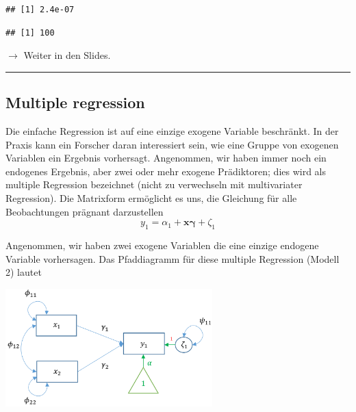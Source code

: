 \documentclass[
]{article}
\newenvironment{Shaded}{\begin{snugshade}}{\end{snugshade}}
\newcommand{\FunctionTok}[1]{\textcolor[rgb]{0.00,0.00,0.00}{#1}}
\newcommand{\NormalTok}[1]{#1}
\newcommand{\SpecialCharTok}[1]{\textcolor[rgb]{0.00,0.00,0.00}{#1}}
\begin{document}
\begin{Shaded}
\end{Shaded}

\begin{verbatim}
## [1] 2.4e-07
\end{verbatim}

\begin{Shaded}
\end{Shaded}

\begin{verbatim}
## [1] 100
\end{verbatim}

\(\rightarrow\) Weiter in den Slides.

\begin{center}\rule{0.5\linewidth}{0.5pt}\end{center}

\hypertarget{multiple-regression}{%
\subsection{Multiple regression}\label{multiple-regression}}

Die einfache Regression ist auf eine einzige exogene Variable
beschränkt. In der Praxis kann ein Forscher daran interessiert sein, wie
eine Gruppe von exogenen Variablen ein Ergebnis vorhersagt. Angenommen,
wir haben immer noch ein endogenes Ergebnis, aber zwei oder mehr exogene
Prädiktoren; dies wird als multiple Regression bezeichnet (nicht zu
verwechseln mit multivariater Regression). Die Matrixform ermöglicht es
uns, die Gleichung für alle Beobachtungen prägnant darzustellen \[
  y_1 = \alpha_1 + \mathbf{x \gamma} + \zeta_1
\]

Angenommen, wir haben zwei exogene Variablen die eine einzige endogene
Variable vorhersagen. Das Pfaddiagramm für diese multiple Regression
(Modell 2) lautet

\includegraphics[width=0.6\textwidth,height=\textheight]{m2 (1).png}
\end{document}
